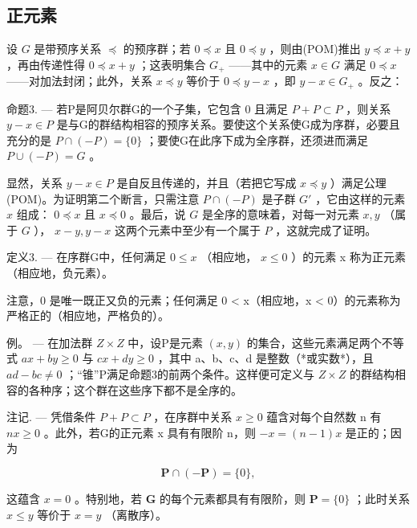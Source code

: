 \subsection{正元素}

设 \(G\) 是带预序关系 \(\preccurlyeq\) 的预序群；若 \(0 \preccurlyeq x\) 且 \(0 \preccurlyeq y\) ，则由(POM)推出 \(y \preccurlyeq x + y\) ，再由传递性得 \(0 \preccurlyeq x + y\) ；这表明集合 \(G_{+}\) ——其中的元素 \(x \in G\) 满足 \(0 \preccurlyeq x\) ——对加法封闭；此外，关系 \(x \preccurlyeq y\) 等价于 \(0 \preccurlyeq y - x\) ，即 \(y - x \in G_{+}\) 。反之：

命题3. --- 若P是阿贝尔群G的一个子集，它包含 0 且满足 \(P + P \subset P\) ，则关系 \(y - x \in P\) 是与G的群结构相容的预序关系。要使这个关系使G成为序群，必要且充分的是 \(P \cap (-P) = \{0\}\) ；要使G在此序下成为全序群，还须进而满足 \(P \cup (-P) = G\) 。

显然，关系 \(y - x \in P\) 是自反且传递的，并且（若把它写成 \(x \preccurlyeq y\) ）满足公理(POM)。为证明第二个断言，只需注意 \(P \cap (-P)\) 是子群 \(G'\) ，它由这样的元素 \(x\) 组成： \(0 \preccurlyeq x\) 且 \(x \preccurlyeq 0\) 。最后，说 \(G\) 是全序的意味着，对每一对元素 \(x, y\) （属于 \(G\) ）， \(x - y, y - x\) 这两个元素中至少有一个属于 \(P\) ，这就完成了证明。

定义3. --- 在序群G中，任何满足 \(0 \leqslant x\) （相应地， \(x \leqslant 0\) ）的元素 x 称为正元素（相应地，负元素）。

注意，0 是唯一既正又负的元素；任何满足 0 \textless{} x（相应地，x \textless{} 0）的元素称为严格正的（相应地，严格负的）。

例。 --- 在加法群 \(Z \times Z\) 中，设P是元素 \((x, y)\) 的集合，这些元素满足两个不等式 \(ax + by \geqslant 0\) 与 \(cx + dy \geqslant 0\) ，其中 a、b、c、d 是整数（*或实数*），且 \(ad - bc \neq 0\) ；“锥”P满足命题3的前两个条件。这样便可定义与 \(Z \times Z\) 的群结构相容的各种序；这个群在这些序下都不是全序的。

注记. --- 凭借条件 \(P + P \subset P\) ，在序群中关系 \(x \geqslant 0\) 蕴含对每个自然数 n 有 \(nx \geqslant 0\) 。此外，若G的正元素 x 具有有限阶 n，则 \(-x = (n - 1)x\) 是正的；因为

\[
\mathbf {P} \cap (- \mathbf {P}) = \{0 \},
\]

这蕴含 \(x = 0\) 。特别地，若 \(\mathbf{G}\) 的每个元素都具有有限阶，则 \(\mathbf{P} = \{0\}\) ；此时关系 \(x \leqslant y\) 等价于 \(x = y\) （离散序）。

